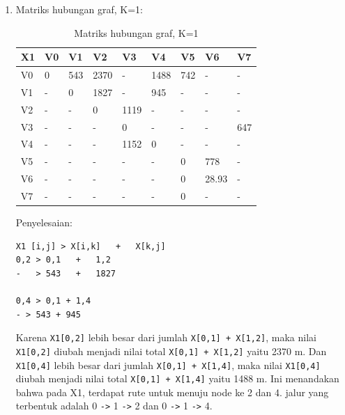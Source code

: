 \begin{enumerate}
\begin{enumerate}
\begin{enumerate}
            \item Matriks hubungan graf, K=1:
                \begin{table}[!htbp]
                \centering
                \caption{Matriks hubungan graf, K=1}
                \label{table32}
                    \begin{tabular}{|l|l|l|l|l|l|l|l|l|}
                    \hline
                        X1 & V0 & V1 & V2 & V3 & V4 & V5 & V6 & V7 \\
                    \hline
                        V0 & 0 & 543 & 2370 & - & 1488 & 742 & - & - \\
                    \hline
                        V1 & - & 0 & 1827 & - & 945 & - & - & - \\
                    \hline
                        V2 & - & - & 0 & 1119 & - & - & - & - \\
                    \hline
                        V3 & - & - & - & 0 & - & - & - & 647 \\
                    \hline
                        V4 & - & - & - & 1152 & 0 & - & - & - \\
                    \hline
                        V5 & - & - & - & - & - & 0 & 778 & - \\
                    \hline
                       V6 & - & - & - & - & - & 0 & 28.93 & - \\
                    \hline
                       V7 & - & - & - & - & - & 0 & - & - \\
                    \hline
                \end{tabular}
                \end{table}
            \par Penyelesaian:
\begin{verbatim}
X1 [i,j] > X[i,k]	+	X[k,j]
0,2	> 0,1	+	1,2
-	> 543	+	1827

0,4	> 0,1 +	1,4
- > 543	+ 945
\end{verbatim}

            \par Karena \verb|X1[0,2]| lebih besar dari jumlah \verb|X[0,1] + X[1,2]|, maka nilai \verb|X1[0,2]| diubah menjadi nilai total \verb|X[0,1] + X[1,2]| yaitu 2370 m. Dan \verb|X1[0,4]| lebih besar dari jumlah \verb|X[0,1] + X[1,4]|, maka nilai \verb|X1[0,4]| diubah menjadi nilai total \verb|X[0,1] + X[1,4]| yaitu 1488 m. Ini menandakan bahwa pada X1, terdapat rute untuk menuju node ke 2 dan 4. jalur yang terbentuk adalah 0 \verb|->| 1 \verb|->| 2 dan 0 \verb|->| 1 \verb|->| 4.
            

\end{enumerate}
\end{enumerate}
\end{enumerate}

